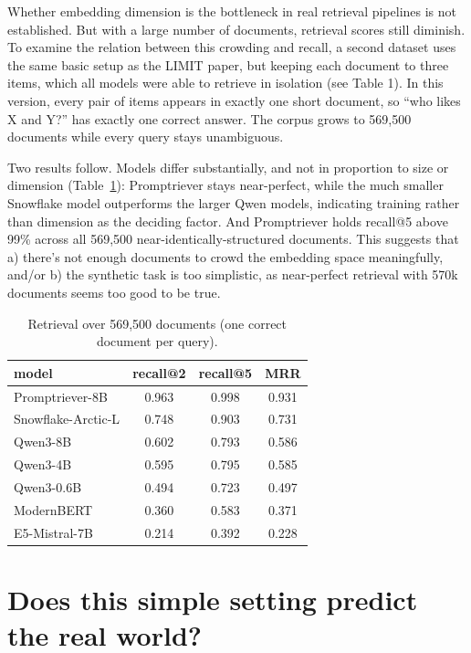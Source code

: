 \documentclass[11pt]{article}
\begin{document}
Whether embedding dimension is the bottleneck in real retrieval pipelines is not established. But with a large number of documents, retrieval scores still diminish. To examine the relation between this crowding and recall, a second dataset uses the same basic setup as the LIMIT paper, but keeping each document to three items, which all models were able to retrieve in isolation (see Table 1). In this version, every pair of items appears in exactly one short document, so ``who likes X and Y?'' has exactly one correct answer. The corpus grows to 569,500 documents while every query stays unambiguous.

Two results follow. Models differ substantially, and not in proportion to size or dimension (Table~\ref{tab:scale}): Promptriever stays near-perfect, while the much smaller Snowflake model outperforms the larger Qwen models, indicating training rather than dimension as the deciding factor. And Promptriever holds recall@5 above 99\% across all 569,500 near-identically-structured documents. This suggests that a) there's not enough documents to crowd the embedding space meaningfully, and/or b) the synthetic task is too simplistic, as near-perfect retrieval with 570k documents seems too good to be true.

\begin{table}[h]
\centering
\caption{Retrieval over 569,500 documents (one correct document per query).}
\label{tab:scale}
\begin{tabular}{lccc}
\toprule
model & recall@2 & recall@5 & MRR \\
\midrule
Promptriever-8B    & 0.963 & 0.998 & 0.931 \\
Snowflake-Arctic-L & 0.748 & 0.903 & 0.731 \\
Qwen3-8B           & 0.602 & 0.793 & 0.586 \\
Qwen3-4B           & 0.595 & 0.795 & 0.585 \\
Qwen3-0.6B         & 0.494 & 0.723 & 0.497 \\
ModernBERT         & 0.360 & 0.583 & 0.371 \\
E5-Mistral-7B      & 0.214 & 0.392 & 0.228 \\
\bottomrule
\end{tabular}
\end{table}

\section{Does this simple setting predict the real world?}
\end{document}
